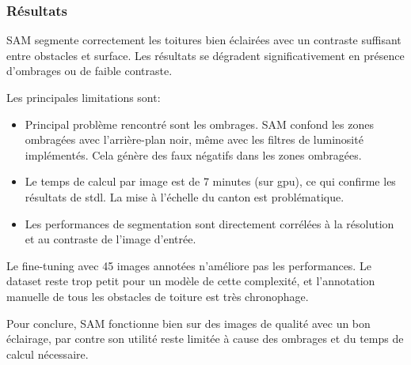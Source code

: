 \subsubsection{Résultats}

SAM segmente correctement les toitures bien éclairées avec un contraste suffisant entre obstacles et surface. Les résultats se dégradent significativement en présence d'ombrages ou de faible contraste.

Les principales limitations sont:
\begin{itemize}
    \item Principal problème rencontré sont les ombrages. SAM confond les zones ombragées avec l'arrière-plan noir, même avec les filtres de luminosité implémentés. Cela génère des faux négatifs dans les zones ombragées.
    \item Le temps de calcul par image est de 7 minutes (sur \acrshort{gpu}), ce qui confirme les résultats de \acrshort{stdl}. La mise à l'échelle du canton est problématique.
    \item Les performances de segmentation sont directement corrélées à la résolution et au contraste de l'image d'entrée.
\end{itemize}

Le fine-tuning avec 45 images annotées n'améliore pas les performances. Le dataset reste trop petit pour un modèle de cette complexité, et l'annotation manuelle de tous les obstacles de toiture est très chronophage.

Pour conclure, SAM fonctionne bien sur des images de qualité avec un bon éclairage, par contre son utilité reste limitée à cause des ombrages et du temps de calcul nécessaire.